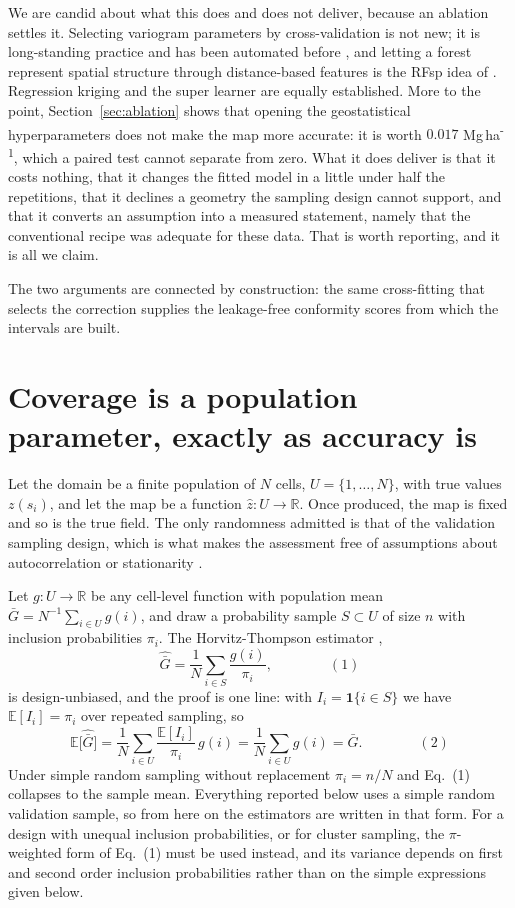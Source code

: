 \documentclass[preprint,12pt,authoryear]{elsarticle}
\newcommand{\Mgha}{Mg\,ha\textsuperscript{-1}}
\newcommand{\eqnum}[1]{\qquad\qquad\mathrm{(#1)}}
\begin{document}
We are candid about what this does and does not deliver, because an ablation
settles it. Selecting variogram parameters by cross-validation is not new; it is
long-standing practice and has been automated before \citep{li2014}, and letting
a forest represent spatial structure through distance-based features is the RFsp
idea of \citet{hengl2018}. Regression kriging and the super learner
\citep{wolpert1992,vanderlaan2007} are equally established. More to the point,
Section~\ref{sec:ablation} shows that opening the geostatistical hyperparameters
does not make the map more accurate: it is worth $0.017$ \Mgha{}, which a paired
test cannot separate from zero. What it does deliver is that it costs nothing,
that it changes the fitted model in a little under half the repetitions, that it
declines a geometry the sampling design cannot support, and that it converts an
assumption into a measured statement, namely that the conventional recipe was
adequate for these data. That is worth reporting, and it is all we claim.

The two arguments are connected by construction: the same cross-fitting that
selects the correction supplies the leakage-free conformity scores from which
the intervals are built.

\section{Coverage is a population parameter, exactly as accuracy is}
\label{sec:ht}

Let the domain be a finite population of $N$ cells, $U=\{1,\dots,N\}$, with true
values $z(s_i)$, and let the map be a function $\hat z: U \rightarrow
\mathbb{R}$. Once produced, the map is fixed and so is the true field. The only
randomness admitted is that of the validation sampling design, which is what
makes the assessment free of assumptions about autocorrelation or stationarity
\citep{degruijter2006,brus2011}.

Let $g: U \rightarrow \mathbb{R}$ be any cell-level function with population
mean $\bar G = N^{-1}\sum_{i \in U} g(i)$, and draw a probability sample
$S \subset U$ of size $n$ with inclusion probabilities $\pi_i$. The
Horvitz-Thompson estimator \citep{horvitz1952},
\[
\widehat{\bar G} = \frac{1}{N}\sum_{i \in S} \frac{g(i)}{\pi_i},
\eqnum{1}
\]
is design-unbiased, and the proof is one line: with $I_i = \mathbf{1}\{i \in S\}$
we have $\mathbb{E}[I_i] = \pi_i$ over repeated sampling, so
\[
\mathbb{E}\big[\widehat{\bar G}\big]
= \frac{1}{N}\sum_{i \in U} \frac{\mathbb{E}[I_i]}{\pi_i}\,g(i)
= \frac{1}{N}\sum_{i \in U} g(i) = \bar G .
\eqnum{2}
\]
Under simple random sampling without replacement $\pi_i = n/N$ and Eq.~(1)
collapses to the sample mean. Everything reported below uses a simple random
validation sample, so from here on the estimators are written in that form. For
a design with unequal inclusion probabilities, or for cluster sampling, the
$\pi$-weighted form of Eq.~(1) must be used instead, and its variance depends on
first and second order inclusion probabilities rather than on the simple
expressions given below.
\end{document}
